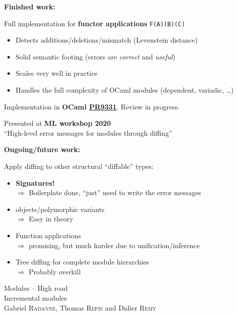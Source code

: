 \documentclass[aspectratio=169,dvipsnames,svgnames,10pt]{beamer}
\begin{document}
\begin{frame}{}
  
  {\Large\bf Finished work:}

  Full implementation for {\bf functor applications} \texttt{F(A)(B)(C)}
  \begin{itemize}
  \item Detects additions/deletions/mismatch (Levenstein distance)
  \item Solid semantic footing (errors are {\it correct} and {\it useful})
  \item Scales very well in practice
  \item Handles the full complexity of OCaml modules (dependent, variadic, \dots)
  \end{itemize}
  
  Implementation in {\bf OCaml \href{https://github.com/ocaml/ocaml/pull/9331}{PR9331}}. Review in progress.
  
  Presented at {\bf ML workshop 2020}\\
  ``High-level error messages for modules through diffing''
\end{frame}


\begin{frame}{}

  {\Large\bf Ongoing/future work:}

  Apply diffing to other structural ``diffable'' types:
  \begin{itemize}
  \item \textbf{Signatures!}\\
    $\Rightarrow$ Boilerplate done, ``just'' need to write the error messages
  \item objects/polymorphic variants\\
    $\Rightarrow$ Easy in theory
  \item Function applications\\
    $\Rightarrow$ promising, but much harder due to unification/inference
  \item Tree diffing for complete module hierarchies\\
    $\Rightarrow$ Probably overkill
  \end{itemize}
\end{frame}

\begin{frame}[t,standout]
  \centering
  \Huge Modules -- High road\\
  \huge Incremental modules\\
  \large Gabriel \textsc{Radanne}, Thomas \textsc{Refis} and Didier \textsc{Remy}
\end{frame}
\end{document}
